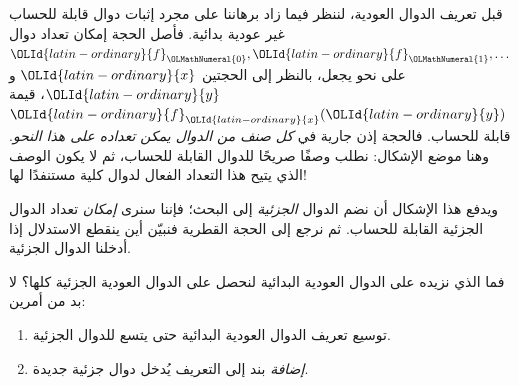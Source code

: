\documentclass[../../../include/open-logic-section]{subfiles}
\begin{document}

قبل تعريف الدوال العودية، لننظر فيما زاد برهاننا على مجرد إثبات دوال قابلة
للحساب غير عودية بدائية. فأصل الحجة
إمكان تعداد دوال ${\OLId{latin-ordinary}{f}}_{\OLMathNumeral{0}},{\OLId{latin-ordinary}{f}}_{\OLMathNumeral{1}},\dots$ على نحو يجعل،
بالنظر إلى الحجتين ${\OLId{latin-ordinary}{x}}$ و${\OLId{latin-ordinary}{y}}$، قيمة ${\OLId{latin-ordinary}{f}}_{\OLId{latin-ordinary}{x}}({\OLId{latin-ordinary}{y}})$ قابلة للحساب. فالحجة إذن جارية في
\emph{كل صنف من الدوال يمكن تعداده على هذا النحو}. وهنا
موضع الإشكال: نطلب وصفًا صريحًا للدوال القابلة للحساب، ثم لا يكون الوصف
الذي يتيح هذا التعداد الفعال لدوال كلية مستنفدًا لها!

ويدفع هذا الإشكال أن نضم الدوال \emph{الجزئية} إلى البحث؛ فإننا سنرى
\emph{إمكان} تعداد الدوال الجزئية القابلة للحساب.
 ثم نرجع إلى الحجة القطرية
فنبيّن أين ينقطع الاستدلال إذا أدخلنا الدوال الجزئية.

فما الذي نزيده على الدوال العودية البدائية لنحصل
على الدوال العودية الجزئية كلها؟ لا بد من أمرين:
\begin{enumerate}
\item توسيع تعريف الدوال العودية البدائية حتى يتسع للدوال الجزئية.
\item \emph{إضافة} بند إلى التعريف يُدخل دوال جزئية
جديدة.
\end{enumerate}
\end{document}
